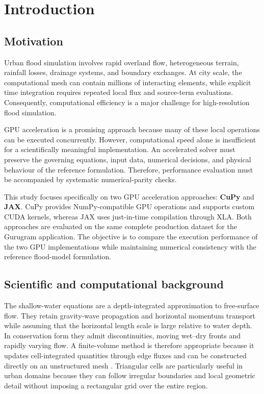 \documentclass[11pt,a4paper,oneside]{report}
\begin{document}
\chapter{Introduction}
\section{Motivation}

Urban flood simulation involves rapid overland flow, heterogeneous terrain, rainfall losses, drainage systems, and boundary exchanges. At city scale, the computational mesh can contain millions of interacting elements, while explicit time integration requires repeated local flux and source-term evaluations. Consequently, computational efficiency is a major challenge for high-resolution flood simulation.

GPU acceleration is a promising approach because many of these local operations can be executed concurrently. However, computational speed alone is insufficient for a scientifically meaningful implementation. An accelerated solver must preserve the governing equations, input data, numerical decisions, and physical behaviour of the reference formulation. Therefore, performance evaluation must be accompanied by systematic numerical-parity checks.

This study focuses specifically on two GPU acceleration approaches: \textbf{CuPy} and \textbf{JAX}. CuPy provides NumPy-compatible GPU operations and supports custom CUDA kernels, whereas JAX uses just-in-time compilation through XLA. Both approaches are evaluated on the same complete production dataset for the Gurugram application. The objective is to compare the execution performance of the two GPU implementations while maintaining numerical consistency with the reference flood-model formulation.

\section{Scientific and computational background}

The shallow-water equations are a depth-integrated approximation to free-surface flow. They
retain gravity-wave propagation and horizontal momentum transport while assuming that the
horizontal length scale is large relative to water depth. In conservation form they admit
discontinuities, moving wet--dry fronts and rapidly varying flow. A finite-volume method is
therefore appropriate because it updates cell-integrated quantities through edge fluxes and
can be constructed directly on an unstructured mesh \cite{leveque2002}. Triangular cells are
particularly useful in urban domains because they can follow irregular boundaries and local
geometric detail without imposing a rectangular grid over the entire region.
\end{document}
